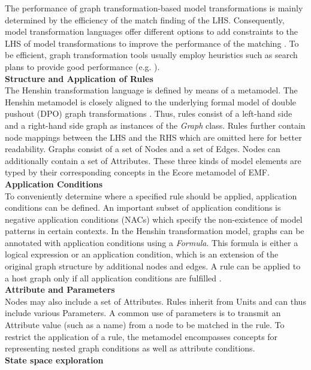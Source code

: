 The performance of graph transformation-based model transformations is mainly determined by the eﬃciency of the match finding of the LHS. Consequently, model transformation languages offer different options to add constraints to the LHS of model transformations to improve the performance of the matching \cite{tichy2013detecting}. To be eﬃcient, graph transformation tools usually employ heuristics such as search plans to provide good performance (e.g. \cite{varro2012algorithm}).\\ 
\textbf{Structure and Application of Rules}\\ 
The Henshin transformation language is defined by means of a metamodel. The Henshin metamodel is closely aligned to the underlying formal model of double pushout (DPO) graph transformations \cite{tichy2013detecting}. Thus, rules consist of a left-hand side and a right-hand side graph as instances of the \emph{Graph} class. Rules further contain node mappings between the LHS and the RHS which are omitted here for better readability. Graphs consist of a set of Nodes and a set of Edges. Nodes can additionally contain a set of Attributes. These three kinds of model elements are typed by their corresponding concepts in the Ecore metamodel of EMF.\\ 
\textbf{Application Conditions}\\ 
To conveniently determine where a specified rule should be applied, application conditions can be defined. An important subset of application conditions is negative application conditions (NACs) which specify the non-existence of model patterns in certain contexts.
In the Henshin transformation model, graphs can be annotated with application conditions using a \emph{Formula}. This formula is either a logical expression or an application condition, which is an extension of the original graph structure by additional nodes and edges. A rule can be applied to a host graph only if all application conditions are fulfilled \cite{arendt2010henshin}.\\
\textbf{Attribute and Parameters}\\ 
Nodes may also include a set of Attributes. Rules inherit from Units and can thus include various Parameters. A common use of parameters is to transmit an Attribute value (such as a name) from a node to be matched in the rule. To restrict the application of a rule, the metamodel encompasses concepts for representing nested graph conditions \cite{habel2009correctness} as well as attribute conditions.\\ 
\textbf{State space exploration}\\ 
